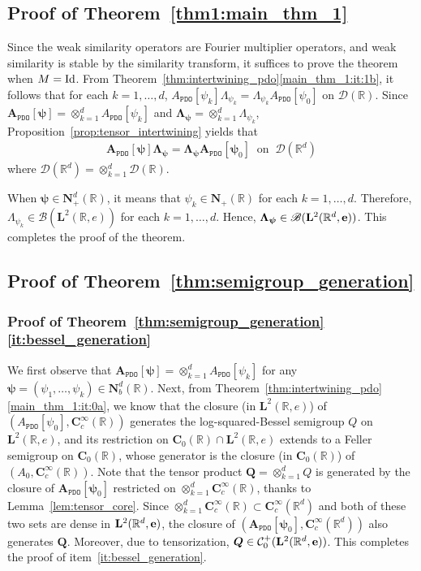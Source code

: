\documentclass[12pt]{amsart}
\newcommand{\hlabel}{\phantomsection\label}
\numberwithin{equation}{section}
\newcommand{\bb}{\mathbb}
\newcommand{\cc}{\mathcal}
\newcommand{\ttt}{\mathtt}
\newcommand{\bmrm}[2][2]{\mathbf{#2}^{#1}}
\newcommand{\C}{\mathbf{C}}
\newcommand{\LRe}{\bmrm{L}(\bb{R},e)}
\newcommand{\LLRe}{\bmrm{L}(\bb R^d,{\bf e})}
\newcommand{\NN}{\mathbf{N}}
\theoremstyle{definition}
\theoremstyle{assump}
\theoremstyle{remark}
\begin{document}
{\subsection{Proof of Theorem~\ref{thm1:main_thm_1}} \label{ss:main_thm_1} Since the weak similarity operators are Fourier multiplier operators, and weak similarity is stable by the similarity transform, it suffices to prove the theorem when $M={\rm Id}$. From Theorem~\ref{thm:intertwining_pdo}\eqref{main_thm_1:it:1b}, it follows that for each $k=1,\ldots, d$, $A_\ttt{PDO}[\psi_k]\Lambda_{\psi_k}=\Lambda_{\psi_k}A_\ttt{PDO}[\psi_0]$ on $\cc{D}(\bb R)$. Since $\bm{A}_{\ttt{PDO}}[\bm \psi]=\otimes_{k=1}^d A_{\ttt{PDO}}[\psi_k]$ and $\bm{\Lambda}_{\bm\psi}=\otimes_{k=1}^d \Lambda_{\psi_k}$, Proposition~\ref{prop:tensor_intertwining} yields that
\begin{align*}
	\bm{A}_\ttt{PDO}[\bm\psi]\bm{\Lambda}_{\bm\psi}=\bm{\Lambda_\psi}\bm{A}_{\ttt{PDO}}[\bm{\psi}_0] \ \text{ on }\: \bm{\cc{D}}(\bb R^d)
\end{align*}
where $\bm{\cc{D}}(\bb R^d)=\otimes_{k=1}^d\cc{D}(\bb R)$.

When $\bm{\psi}\in\NN^d_+(\bb R)$, it means that $\psi_k\in\NN_+(\bb R)$ for each $k=1,\ldots, d$. Therefore, $\Lambda_{\psi_k}\in\mathscr{B}(\LRe)$ for each $k=1,\ldots, d$. Hence, $\bm{\Lambda_\psi}\in\mathscr{B}(\LLRe)$. This completes the proof of the theorem.

\subsection{Proof of Theorem~\ref{thm:semigroup_generation}} \hlabel{ss:pf_thm:semigroup_generation}
\subsubsection{Proof of Theorem~\ref{thm:semigroup_generation}\eqref{it:bessel_generation}} We first observe that $\bm{A}_{\ttt{PDO}}[\bm\psi]=\otimes_{k=1}^d A_\ttt{PDO}[\psi_k]$ for any $\bm{\psi}=(\psi_1,\ldots,\psi_k)\in\NN^d_b(\bb R)$. Next, from Theorem~\ref{thm:intertwining_pdo}\eqref{main_thm_1:it:0a}, we know that the closure (in $\LRe$) of $(A_\ttt{PDO}[\psi_0],\C^\infty_c(\bb R))$ generates the log-squared-Bessel semigroup $Q$ on $\LRe$, and its restriction on $\C_0(\bb R)\cap\LRe$ extends to a Feller semigroup on $\C_0(\bb R)$, whose generator is the closure (in $\C_0(\bb R)$) of $(A_0,\C^\infty_c(\bb R))$. Note that the tensor product $\bm{Q}=\otimes_{k=1}^d Q$ is generated by the closure of $\bm{A}_{\ttt{PDO}}[\bm\psi_0]$ restricted on $\otimes_{k=1}^d \C^\infty_c(\bb R)$, thanks to Lemma~\ref{lem:tensor_core}. Since $\otimes_{k=1}^d \C^\infty_c(\bb R)\subset\C^\infty_c(\bb R^d)$ and both of these two sets are dense in $\LLRe$, the closure of $(\bm{A}_\ttt{PDO}[\bm\psi_0],\C^\infty_c(\bb R^d))$ also generates $\bm{Q}$. Moreover, due to tensorization, $\bm{Q}\in\cc{C}^+_0(\LLRe)$. This completes the proof of item~\eqref{it:bessel_generation}.

}
\end{document}
